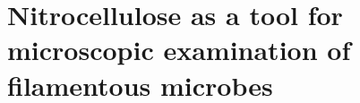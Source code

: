 \chapter{Nitrocellulose as a tool for microscopic examination of filamentous microbes}\label{ch:NitroAssay}







